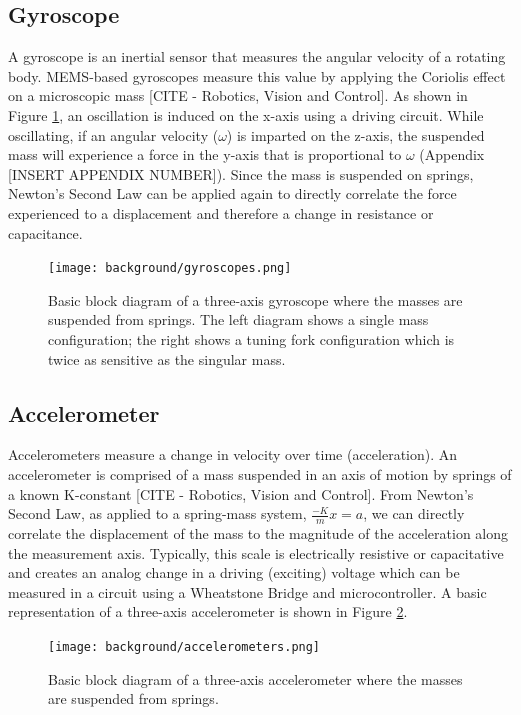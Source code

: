 \subsection{Gyroscope} \label{ssec:gyroscope}
A gyroscope is an inertial sensor that measures the angular velocity of a rotating body.
MEMS-based gyroscopes measure this value by applying the Coriolis effect on a microscopic mass [CITE - Robotics, Vision and Control].
As shown in Figure \ref{fig:gyroscopes}, an oscillation is induced on the x-axis using a driving circuit.
While oscillating, if an angular velocity ($\omega$) is imparted on the z-axis, the suspended mass will experience a force in the y-axis that is proportional to $\omega$ (Appendix [INSERT APPENDIX NUMBER]).
Since the mass is suspended on springs, Newton's Second Law can be applied again to directly correlate the force experienced to a displacement and therefore a change in resistance or capacitance.

\begin{figure}[h!]
    \caption[Gyroscope block diagram]{Basic block diagram of a three-axis gyroscope where the masses are suspended from springs. The left diagram shows a single mass configuration; the right shows a tuning fork configuration which is twice as sensitive as the singular mass.}
    \label{fig:gyroscopes}
    \centering
    \texttt{[image: background/gyroscopes.png]}
\end{figure}

\subsection{Accelerometer} \label{ssec:accelerometer}
Accelerometers measure a change in velocity over time (acceleration).
An accelerometer is comprised of a mass suspended in an axis of motion by springs of a known K-constant [CITE - Robotics, Vision and Control].
From Newton's Second Law, as applied to a spring-mass system, $\frac{-K}{m}x=a$, we can directly correlate the displacement of the mass to the magnitude of the acceleration along the measurement axis.
Typically, this scale is electrically resistive or capacitative and creates an analog change in a driving (exciting) voltage which can be measured in a circuit using a Wheatstone Bridge and microcontroller.
A basic representation of a three-axis accelerometer is shown in Figure \ref{fig:accelerometers}.

\begin{figure}[h!]
    \caption[Accelerometer block diagram]{Basic block diagram of a three-axis accelerometer where the masses are suspended from springs.}
    \label{fig:accelerometers}
    \centering
    \texttt{[image: background/accelerometers.png]}
\end{figure}

